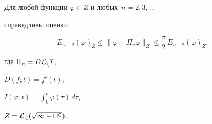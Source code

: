 \begin{cornonum}


Для любой функции $\varphi\in Z$ и любых $\, n=2,3,\dotsc$


справедливы оценки


\begin{equation}


E_{n-2}(\varphi)_Z\le \|\varphi -\Pi_n\varphi\|_Z\le


\frac{\pi}{2}\, E_{n-2}(\varphi)_Z,


\end{equation}


где $\Pi_n=D\cal{L}_nI$,


$D(f;t)=f'(t)$,


$I(\varphi ;t)=\int_0^t\varphi (\tau)\, d\tau$,


$Z=\cal L_2(\sqrt{1-t^2})$.


\end{cornonum}





